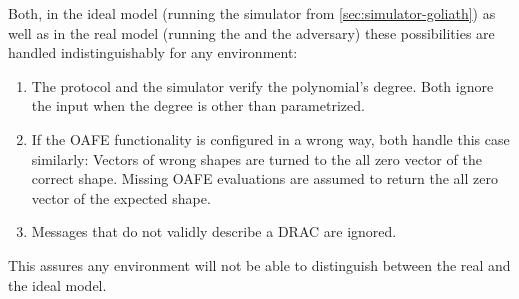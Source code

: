 \noindent{}Both, in the ideal model (running the simulator from
\ref{sec:simulator-goliath}) as well as in the real model (running the
\JWprotoSymOPE{} and the adversary) these possibilities are handled
indistinguishably for any environment:

\begin{enumerate}

  \item The protocol and the simulator verify the polynomial's degree.
    Both ignore the input when the degree is other than parametrized.

  \item If the OAFE functionality is configured in a wrong way, both handle this
    case similarly: Vectors of wrong shapes are turned to the all zero vector of
    the correct shape. Missing OAFE evaluations are assumed to return the all
    zero vector of the expected shape.

  \item Messages that do not validly describe a DRAC are ignored.

\end{enumerate}

This assures any environment will not be able to distinguish between the real
and the ideal model.

